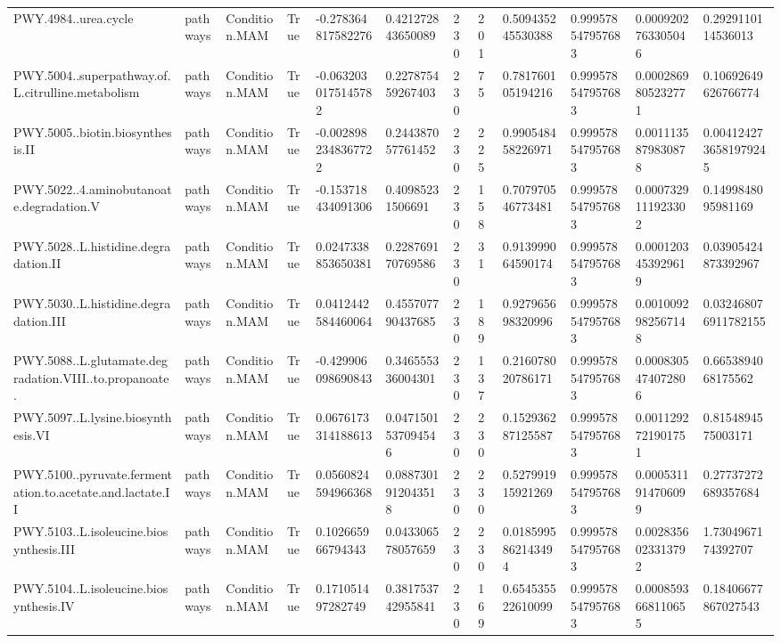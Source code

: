 \begin{longtable}{llllllllllll}
PWY.4984..urea.cycle & pathways & Condition.MAM & True & -0.278364817582276 & 0.421272843650089 & 230 & 201 & 0.509435245530388 & 0.999578547957683 & 0.0009202763305046 & 0.2929110114536013 \\
PWY.5004..superpathway.of.L.citrulline.metabolism & pathways & Condition.MAM & True & -0.0632030175145782 & 0.227875459267403 & 230 & 75 & 0.781760105194216 & 0.999578547957683 & 0.0002869805232771 & 0.10692649626766774 \\
PWY.5005..biotin.biosynthesis.II & pathways & Condition.MAM & True & -0.0028982348367722 & 0.244387057761452 & 230 & 225 & 0.990548458226971 & 0.999578547957683 & 0.0011135879830878 & 0.0041242736581979245 \\
PWY.5022..4.aminobutanoate.degradation.V & pathways & Condition.MAM & True & -0.153718434091306 & 0.40985231506691 & 230 & 158 & 0.707970546773481 & 0.999578547957683 & 0.0007329111923302 & 0.1499848095981169 \\
PWY.5028..L.histidine.degradation.II & pathways & Condition.MAM & True & 0.0247338853650381 & 0.228769170769586 & 230 & 31 & 0.913999064590174 & 0.999578547957683 & 0.0001203453929619 & 0.03905424873392967 \\
PWY.5030..L.histidine.degradation.III & pathways & Condition.MAM & True & 0.0412442584460064 & 0.455707790437685 & 230 & 189 & 0.927965698320996 & 0.999578547957683 & 0.0010092982567148 & 0.032468076911782155 \\
PWY.5088..L.glutamate.degradation.VIII..to.propanoate. & pathways & Condition.MAM & True & -0.429906098690843 & 0.346555336004301 & 230 & 137 & 0.216078020786171 & 0.999578547957683 & 0.0008305474072806 & 0.6653894068175562 \\
PWY.5097..L.lysine.biosynthesis.VI & pathways & Condition.MAM & True & 0.0676173314188613 & 0.0471501537094546 & 230 & 230 & 0.152936287125587 & 0.999578547957683 & 0.0011292721901751 & 0.8154894575003171 \\
PWY.5100..pyruvate.fermentation.to.acetate.and.lactate.II & pathways & Condition.MAM & True & 0.0560824594966368 & 0.0887301912043518 & 230 & 230 & 0.527991915921269 & 0.999578547957683 & 0.0005311914706099 & 0.27737272689357684 \\
PWY.5103..L.isoleucine.biosynthesis.III & pathways & Condition.MAM & True & 0.102665966794343 & 0.043306578057659 & 230 & 230 & 0.0185995862143494 & 0.999578547957683 & 0.0028356023313792 & 1.7304967174392707 \\
PWY.5104..L.isoleucine.biosynthesis.IV & pathways & Condition.MAM & True & 0.171051497282749 & 0.381753742955841 & 230 & 169 & 0.654535522610099 & 0.999578547957683 & 0.0008593668110655 & 0.18406677867027543 \\

\end{longtable}
